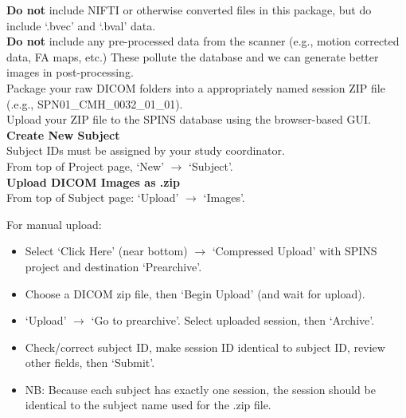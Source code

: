 \documentclass[a4paper,11pt,oneside]{book}
\newcommand\titlesL{%
    \noindent
    \small
    \leftskip=0in
    \textbf
}
\newcommand\stepsL{
    \noindent
    \leftskip=0.15in
    \small
}
\newcommand\stepsR{
    \noindent
    \leftskip=0.3in
    \small
}
\begin{document}
\begin{multicols}{2}
{\stepsL{\textbf{Do not} include NIFTI or otherwise converted files in this package, but do include `.bvec' and `.bval' data.} \\

\stepsL{\textbf{Do not} include any pre-processed data from the scanner (e.g., motion corrected data, FA maps, etc.) These pollute the database and we can generate better images in post-processing.} \\

\stepsL{Package your raw DICOM folders into a appropriately named session ZIP file (.e.g., SPN01\_CMH\_0032\_01\_01).} \\

\stepsL{Upload your ZIP file to the SPINS database using the browser-based GUI.} \\

\titlesL{Create New Subject} \\

\stepsL{Subject IDs must be assigned by your study coordinator.} \\

\stepsL{From top of Project page, `New' $\rightarrow$ `Subject'.} \\


\titlesL{Upload DICOM Images as .zip} \\

\stepsL{From top of Subject page: `Upload' $\rightarrow$ `Images'.} \\ 


%
\columnbreak

%
\stepsR{For manual upload:}
\stepsR{\begin{itemize}  
            \item{Select `Click Here' (near bottom) $\rightarrow$ `Compressed Upload' with SPINS project and destination `Prearchive'.}  
            \item{Choose a DICOM zip file, then `Begin Upload' (and wait for upload).}  
            \item{`Upload' $\rightarrow$ `Go to prearchive'. Select uploaded session, then `Archive'.}  
            \item{Check/correct subject ID, make session ID identical to subject ID, review other fields, then `Submit'.}
            \item{NB: Because each subject has exactly one session, the session should be identical to the subject name used for the .zip file.}
        \end{itemize}
        }

}
\end{multicols}
\end{document}
